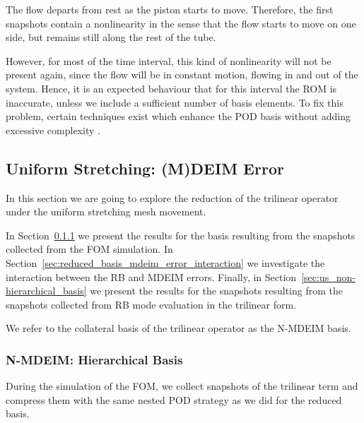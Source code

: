 \documentclass[../../thesis.tex]{subfiles}
\begin{document}
The flow departs from rest as the piston starts to move.
Therefore, the first snapshots contain a nonlinearity in the sense that the flow starts to move on one side, 
but remains still along the rest of the tube.

However, for most of the time interval, this kind of nonlinearity will not be present again,
since the flow will be in constant motion, flowing in and out of the system.
Hence, it is an expected behaviour that for this interval the ROM is inaccurate,
unless we include a sufficient number of basis elements.
To fix this problem, certain techniques exist which enhance the POD basis 
without adding excessive complexity \cite{weightedPOD}.

\subsection{Uniform Stretching: (M)DEIM Error}
\label{sec:uniform_mdeim_errors}
In this section we are going to explore the reduction of the trilinear operator
under the uniform stretching mesh movement.

In Section~\ref{sec:us_hierarchical_basis} we present the results for
the basis resulting from the snapshots collected from the FOM simulation.
In Section~\ref{sec:reduced_basis_mdeim_error_interaction} we investigate
the interaction between the RB and MDEIM errors.
Finally, in Section~\ref{sec:us_non-hierarchical_basis} we present the results for
the snapshots resulting from the snapshots collected from RB mode evaluation
in the trilinear form.

We refer to the collateral basis of the trilinear operator as the N-MDEIM basis.

\subsubsection{N-MDEIM: Hierarchical Basis}
\label{sec:us_hierarchical_basis}


During the simulation of the FOM, 
we collect snapshots of the trilinear term and compress them with the same  
nested POD strategy as we did for the reduced basis.
\end{document}
